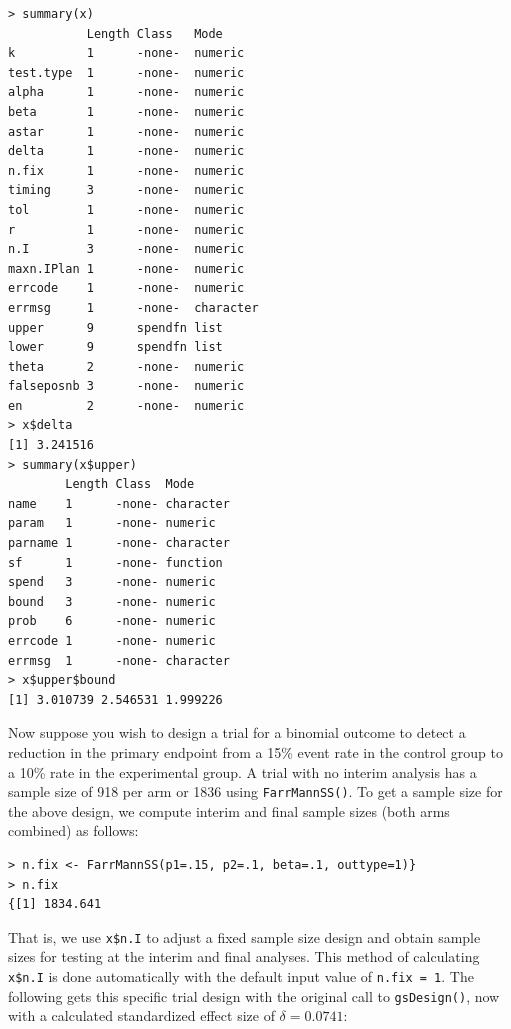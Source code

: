 \begin{verbatim}
> summary(x)
           Length Class   Mode     
k          1      -none-  numeric  
test.type  1      -none-  numeric  
alpha      1      -none-  numeric  
beta       1      -none-  numeric  
astar      1      -none-  numeric  
delta      1      -none-  numeric  
n.fix      1      -none-  numeric  
timing     3      -none-  numeric  
tol        1      -none-  numeric  
r          1      -none-  numeric  
n.I        3      -none-  numeric  
maxn.IPlan 1      -none-  numeric  
errcode    1      -none-  numeric  
errmsg     1      -none-  character
upper      9      spendfn list     
lower      9      spendfn list     
theta      2      -none-  numeric  
falseposnb 3      -none-  numeric  
en         2      -none-  numeric  
> x$delta
[1] 3.241516
> summary(x$upper)
        Length Class  Mode     
name    1      -none- character
param   1      -none- numeric  
parname 1      -none- character
sf      1      -none- function 
spend   3      -none- numeric  
bound   3      -none- numeric  
prob    6      -none- numeric  
errcode 1      -none- numeric  
errmsg  1      -none- character
> x$upper$bound
[1] 3.010739 2.546531 1.999226
\end{verbatim}

\bigskip
Now suppose you wish to design a trial for a binomial outcome to detect a
reduction in the primary endpoint from a 15\% event rate in the control group
to a 10\% rate in the experimental group. A trial with no interim analysis has
a sample size of 918 per arm or 1836 using \texttt{FarrMannSS()}. To get a
sample size for the above design, we compute interim and final sample sizes
(both arms combined) as follows:

\bigskip
\begin{verbatim}
> n.fix <- FarrMannSS(p1=.15, p2=.1, beta=.1, outtype=1)}
> n.fix
{[1] 1834.641
\end{verbatim}

\bigskip
That is, we use \texttt{x\$n.I} to adjust a fixed sample size design and
obtain sample sizes for testing at the interim and final analyses. This method
of calculating \texttt{x\$n.I} is done automatically with the default input
value of \texttt{n.fix = 1}. The following gets this specific trial design with
the original call to \texttt{gsDesign()}, now with a calculated standardized
effect size of $\delta = 0.0741$:

